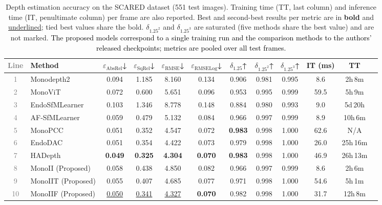 \documentclass[a4paper,fleqn]{cas-dc}
\begin{document}
{\begin{table}[!hbt]
\centering
\begin{tabular}{clcccccccccc}
\toprule
\textcolor{gray}{Line} & Method & $\varepsilon_\text{AbsRel}$↓ & 
        $\varepsilon_\text{SqRel}$↓ & 
        $\varepsilon_\text{RMSE}$↓ & 
        $\varepsilon_\text{RMSELog}$↓ & 
        $\delta_{1.25}$↑ & 
        $\delta_{1.25^2}$↑ & 
        $\delta_{1.25^3}$↑ & 
        IT (ms) & TT \\
\midrule
\textcolor{gray}{1} & Monodepth2     & 0.094 & 1.185 & 8.160 & 0.134 & 0.906 & 0.981 & 0.995 & 8.6  & 2h\,8m  \\
\textcolor{gray}{2} &MonoViT        & 0.072 & 0.600 & 5.651 & 0.096 & 0.953 & 0.995 & 0.999 & 59.5 & 5h\,9m  \\
\textcolor{gray}{3} &EndoSfMLearner & 0.103 & 1.346 & 8.778 & 0.148 & 0.884 & 0.980 & 0.993 & 9.0  & 5d\,20h \\
\textcolor{gray}{4} &AF-SfMLearner  & 0.059 & 0.479 & 5.132 & 0.084 & 0.966 & 0.997 & 0.999 & 8.9  & 10h\,6m \\
\textcolor{gray}{5} &MonoPCC        & 0.051 & 0.352 & 4.547 & 0.072 & \textbf{0.983} & 0.998 & 1.000 & 62.6 & N/A \\
\textcolor{gray}{6} &EndoDAC        & 0.051 & 0.354 & 4.422 & 0.073 & 0.979 & 0.998 & 1.000 & 26.0 & 25h\,16m\\
\textcolor{gray}{7} &HADepth        & \textbf{0.049} & \textbf{0.325} & \textbf{4.304} & \textbf{0.070} & \textbf{0.983} & 0.998 & 1.000 & 46.9 & 26h\,13m\\
\midrule
\textcolor{gray}{8} &MonoII  (Proposed) & 0.058 & 0.438 & 4.850 & 0.082 & 0.966 & 0.997 & 0.999 & 8.6  & 2h\,6m  \\
\textcolor{gray}{9} &MonoIIT (Proposed) & 0.055 & 0.407 & 4.685 & 0.077 & 0.971 & 0.998 & 1.000 & 54.6 & 5h\,1m  \\
\textcolor{gray}{10} &MonoIIF (Proposed) & \underline{0.050} & \underline{0.341} & \underline{4.327} & \textbf{0.070} & 0.982 & 0.998 & 1.000 & 31.7 & 12h\,8m \\
\bottomrule
\end{tabular}
\caption{Depth estimation accuracy on the SCARED dataset 
(551 test images). Training time (TT, last column) and inference time (IT, penultimate column)
per frame are also reported. Best and second-best 
results per metric are in \textbf{bold} and 
\underline{underlined}; tied best values share the bold. $\delta_{1.25^2}$ and $\delta_{1.25^3}$ are saturated (five methods share the best value) and are not marked. \textcolor{black}{The proposed models correspond to a single training run and the comparison methods to the authors' released checkpoints; metrics are pooled over all test frames.}}
\label{tab:quant_scared}
\end{table}
}
\end{document}
